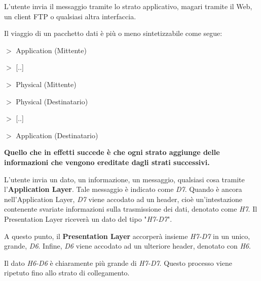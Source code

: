         \vspace{3mm}
        
        L'utente invia il messaggio tramite lo strato applicativo, magari tramite il Web, un client FTP o qualsiasi altra interfaccia.
        
        \vspace{3mm}
        
        Il viaggio di un pacchetto dati è più o meno sintetizzabile come segue:
        
        \vspace{3mm}
        
        \(>\) Application (Mittente) 
        
        \(>\) [..] 
        
        \(>\) Physical (Mittente) 
        
        \(>\) Physical (Destinatario) 
        
        \(>\) [..] 
        
        \(>\) Application (Destinatario)
        
        \vspace{3mm}
        
        \textbf{Quello che in effetti succede è che ogni strato aggiunge delle informazioni che vengono ereditate dagli strati successivi.}
        
        L'utente invia un dato, un informazione, un messaggio, qualsiasi cosa tramite l'\textbf{Application Layer}. Tale messaggio è indicato come \textit{D7}. Quando è ancora nell'Application Layer, \textit{D7} viene accodato ad un header, cioè un'intestazione contenente svariate informazioni sulla trasmissione dei dati, denotato come \textit{H7}. Il Presentation Layer riceverà un dato del tipo "\textit{H7-D7}". 
        
        \vspace{3mm}
        
        A questo punto, il \textbf{Presentation Layer} accorperà insieme \textit{H7-D7} in un unico, grande, \textit{D6}. Infine, \textit{D6} viene accodato ad un ulteriore header, denotato con \textit{H6}. 
        
        \vspace{3mm}
        
        Il dato \textit{H6-D6} è chiaramente più grande di \textit{H7-D7}. Questo processo viene ripetuto fino allo strato di collegamento. 
        
        \vspace{3mm}
        
